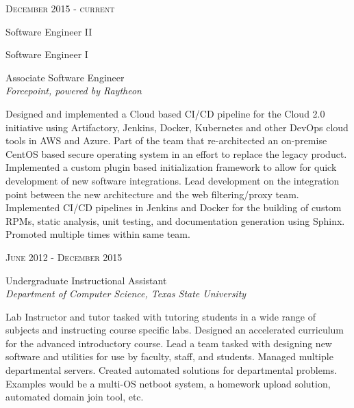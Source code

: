 \documentclass[10pt]{article} %
\begin{document}
\begin{minipage}[t]{0.5\textwidth}
{\raggedleft\textsc{December 2015 - current}\par}

{
\raggedright\large Software Engineer II\\
\raggedright\small Software Engineer I\\
\raggedright\small Associate Software Engineer\\
\textit{Forcepoint, powered by Raytheon}\\[5pt]}

\normalsize{Designed and implemented a Cloud based CI/CD pipeline for the Cloud 2.0 initiative using Artifactory, Jenkins, Docker, Kubernetes and other DevOps cloud tools in AWS and Azure. Part of the team that re-architected an on-premise CentOS based secure operating system in an effort to replace the legacy product. Implemented a custom plugin based initialization framework to allow for quick development of new software integrations. Lead development on the integration point between the new architecture and the web filtering/proxy team. Implemented CI/CD pipelines in Jenkins and Docker for the building of custom RPMs, static analysis, unit testing, and documentation generation using Sphinx. Promoted multiple times within same team.}\\



{\raggedleft\textsc{June 2012 - December 2015}\par}

{\raggedright\large Undergraduate Instructional Assistant\\
\textit{Department of Computer Science, Texas State University}\\[5pt]}

\normalsize{Lab Instructor and tutor tasked with tutoring students in a wide range of subjects and instructing course specific labs. Designed an accelerated curriculum for the advanced introductory course. Lead a team tasked with designing new software and utilities for use by faculty, staff, and students. Managed multiple departmental servers. Created automated solutions for departmental problems. Examples would be a multi-OS netboot system, a homework upload solution, automated domain join tool, etc.}\\


\end{minipage}
\end{document}
